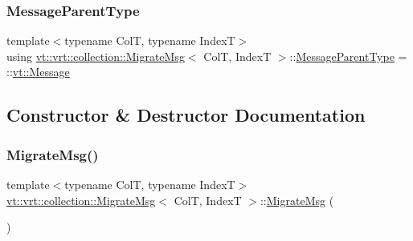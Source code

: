 \subsubsection{\texorpdfstring{Message\+Parent\+Type}{MessageParentType}}
{\footnotesize\ttfamily template$<$typename ColT, typename IndexT$>$ \\
using \hyperlink{structvt_1_1vrt_1_1collection_1_1_migrate_msg}{vt\+::vrt\+::collection\+::\+Migrate\+Msg}$<$ ColT, IndexT $>$\+::\hyperlink{structvt_1_1messaging_1_1_active_msg_ac2e6d93267991027ce78c968b17064c7}{Message\+Parent\+Type} =  \+::\hyperlink{namespacevt_a3a3ddfef40b4c90915fa43cdd5f129ea}{vt\+::\+Message}}



\subsection{Constructor \& Destructor Documentation}
\mbox{\label{structvt_1_1vrt_1_1collection_1_1_migrate_msg_a0b41c5d241e067dadb4648653f9909bc}} 
\subsubsection{\texorpdfstring{Migrate\+Msg()}{MigrateMsg()}\hspace{0.1cm}{\footnotesize\ttfamily [1/2]}}
{\footnotesize\ttfamily template$<$typename ColT, typename IndexT$>$ \\
\hyperlink{structvt_1_1vrt_1_1collection_1_1_migrate_msg}{vt\+::vrt\+::collection\+::\+Migrate\+Msg}$<$ ColT, IndexT $>$\+::\hyperlink{structvt_1_1vrt_1_1collection_1_1_migrate_msg}{Migrate\+Msg} (\begin{DoxyParamCaption}{ }\end{DoxyParamCaption})\hspace{0.3cm}{\ttfamily [default]}}

\mbox{\label{structvt_1_1vrt_1_1collection_1_1_migrate_msg_a998fcb7e752665042449188788481edb}} 
